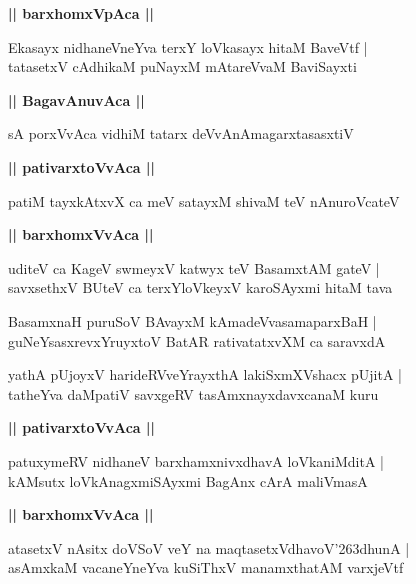 \documentclass[twoside,12pt,openright]{book}
\def\S{\char'263}
\newcounter{shloka}[chapter]
\def\uvaca#1{\centerline{{\large\textbf{#1}}}}
\begin{document}
\uvaca{|| barxhomxVpAca ||}

\begin{shloka}%
Ekasayx nidhaneVneYva terxY loVkasayx hitaM BaveVtf |\\
tatasetxV cAdhikaM puNayxM mAtareVvaM BaviSayxti
\end{shloka}

\uvaca{|| BagavAnuvAca ||}

\begin{shloka}%
sA porxVvAca vidhiM tatarx deVvAnAmagarxtasasxtiV 
\end{shloka}

\uvaca{|| pativarxtoVvAca ||}

\begin{shloka}%
patiM tayxkAtxvX ca meV satayxM shivaM teV nAnuroVcateV 
\end{shloka}

\uvaca{|| barxhomxVvAca ||}

\begin{shloka}%
uditeV ca KageV swmeyxV katwyx teV BasamxtAM gateV |\\
savxsethxV BUteV ca terxYloVkeyxV karoSAyxmi hitaM tava
\end{shloka}

\begin{shloka}%
BasamxnaH puruSoV BAvayxM kAmadeVvasamaparxBaH |\\
guNeYsasxrevxYruyxtoV BatAR rativatatxvXM ca saravxdA 
\end{shloka}

\begin{shloka}%
yathA pUjoyxV harideRVveYrayxthA lakiSxmXVshacx pUjitA |\\
tatheYva daMpatiV savxgeRV tasAmxnayxdavxcanaM kuru
\end{shloka}

\uvaca{|| pativarxtoVvAca ||}

\begin{shloka}%
patuxymeRV nidhaneV barxhamxnivxdhavA loVkaniMditA |\\
kAMsutx loVkAnagxmiSAyxmi BagAnx cArA maliVmasA 
\end{shloka}

\uvaca{|| barxhomxVvAca ||}

\begin{shloka}%
atasetxV nAsitx doVSoV veY na maqtasetxVdhavoV\S dhunA |\\
asAmxkaM vacaneYneYva kuSiThxV manamxthatAM varxjeVtf 
\end{shloka}
\end{document}
